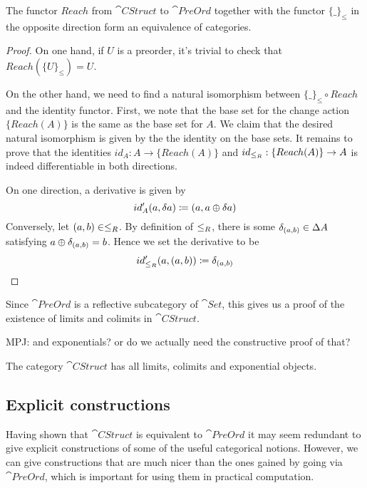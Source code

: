 \begin{thm}
  The functor $Reach$ from $\cat{CStruct}$ to $\cat{PreOrd}$ together with the 
  functor $\{\_\}_\leq$ in the opposite direction form an equivalence of categories.
\end{thm}
\ifproofs
\begin{proof}
  On one hand, if $U$ is a preorder, it's trivial to check that $Reach (\{U\}_\leq) = U$.

  On the other hand, we need to find a natural isomorphism between $\{\_\}_\leq \circ Reach$
  and the identity functor. First, we note that the base set for the change action $\{Reach(A)\}$ is
  the same as the base set for $A$. We claim that the desired natural isomorphism is given by the
  the identity on the base sets. It remains to prove that the identities
  $id_A : A \rightarrow \{Reach(A)\}$ and $id_{\leq_R} : \{Reach(A)\} \rightarrow A$
  is indeed differentiable in both directions.

  On one direction, a derivative is given by
  $$
    id'_A(a, \delta a) \coloneqq (a, a \oplus \delta a)
  $$
  Conversely, let $(a, b) \in \leq_R$. By definition of $\leq_R$, there is some
  $\delta_{(a, b)} \in \Delta A$ satisfying $a \oplus \delta_{(a,b)} = b$. Hence we set the
  derivative to be
  $$
    id'_{\leq_R}(a, (a, b)) \coloneqq \delta_{(a, b)}
  $$
\end{proof}
\fi

Since $\cat{PreOrd}$ is a reflective subcategory of $\cat{Set}$, this gives us a proof
of the existence of limits and colimits in $\cat{CStruct}$.

MPJ: and exponentials? or do we actually need the constructive proof of that?

\begin{corollary}
  The category $\cat{CStruct}$ has all limits, colimits and exponential objects. 
\end{corollary}

\subsection{Explicit constructions}

Having shown that $\cat{CStruct}$ is equivalent to $\cat{PreOrd}$ it may seem
redundant to give explicit constructions of some of the useful categorical
notions. However, we can give constructions that are much nicer than the ones
gained by going via $\cat{PreOrd}$, which is important for using them in
practical computation.

